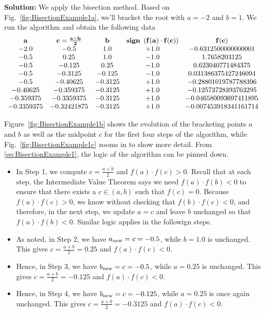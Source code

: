 \vspace*{0.2cm}

\textbf{Solution:} We apply the bisection method. Based on Fig.~\ref{fig:BisectionExample1a}, we'll bracket the root with $a=-2$ and $b=1$. We run the algorithm and obtain the following data
\begin{equation}
\label{eq:BisectionExample1}
\begin{array}{ccccc}
{\bf a} & {\bf c=\frac{a+b}{2}} & {\bf b} &{\bf {\rm \bf sign}~\left(f(a)\cdot f(c) \right)}  &{\bf  f(c)} \\
-2.0 & -0.5 & 1.0 & +1.0 & -0.6312500000000001 \\
-0.5 & 0.25 & 1.0 & -1.0 & 1.7658203125 \\
-0.5 & -0.125 & 0.25 & -1.0 & 0.623040771484375 \\
-0.5 & -0.3125 & -0.125 & -1.0 & 0.031386375427246094 \\
-0.5 & -0.40625 & -0.3125 & +1.0 & -0.28801019787788396 \\
-0.40625 & -0.359375 & -0.3125 & +1.0 & -0.12573728393763295 \\
-0.359375 & -0.3359375 & -0.3125 & +1.0 & -0.046580093697411895 \\
-0.3359375 & -0.32421875 & -0.3125 & +1.0 & -0.007453918341161714 \\
\end{array}
\end{equation}

Figure~\ref{fig:BisectionExample1b} shows the evolution of the bracketing points $a$ and $b$ as well as the midpoint $c$ for the first four steps of the algorithm, while Fig.~\ref{fig:BisectionExample1c} zooms in to show more detail.
From \eqref{eq:BisectionExample1}, the logic of the algorithm can be pinned down. 

\vspace*{0.2cm}

\begin{tcolorbox}[title=\textbf{\large Logic of the Algorithm in Detail}]
\begin{itemize}
    \item In Step 1, we compute $c= \frac{a+b}{2}$ and  $f(a) \cdot f(c) >0$. Recall that at each step, the Intermediate Value Theorem says we need $f(a) \cdot f(b)<0$ to ensure that there exists a $c\in (a, b)$ such that $f(c)=0$.  Because  $f(a) \cdot f(c) >0$, we know without checking that $f(b) \cdot f(c) < 0$, and therefore, in the next step, we update $a=c$ and leave $b$ unchanged so that $f(a) \cdot f(b) < 0$. Similar logic applies in the followign steps.
    \item As noted, in Step 2, we have $a_{\rm new}=c = -0.5$, while $b=1.0$ is unchanged. This gives $c=\frac{a+b}{2}=0.25$ and  $f(a) \cdot f(c) <0$. 
    \item Hence, in Step 3, we have $b_{\rm new}=c = -0.5$, while $a=0.25$ is unchanged. This gives $c=\frac{a+b}{2}=-0.125$ and  $f(a) \cdot f(c) <0$.  
    \item Hence, in Step 4, we have $b_{\rm new}=c = -0.125$, while $a=0.25$ is once again unchanged. This gives $c=\frac{a+b}{2}=-0.3125$ and  $f(a) \cdot f(c) <0$. 
\end{itemize}
\end{tcolorbox}

